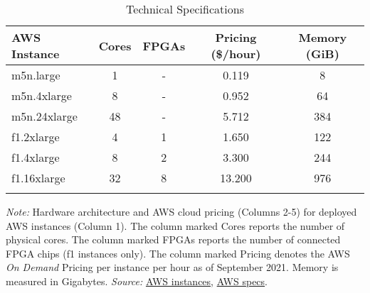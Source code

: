 \documentclass[12pt,american]{article}
\makeatletter
\newcommand{\cpuI}{m5n.large\@\xspace}
\newcommand{\cpuII}{m5n.4xlarge\@\xspace}
\newcommand{\cpuIII}{m5n.24xlarge\@\xspace}
\newcommand{\awsinstfI}{f1.2xlarge\@\xspace}
\newcommand{\awsinstfII}{f1.4xlarge\@\xspace}
\newcommand{\awsinstfIII}{f1.16xlarge\@\xspace}
\makeatother
\begin{document}
\begin{table}[ht!]
\begin{center}
\caption{Technical Specifications}
\begin{tabular}{l c c c c}
\toprule
\textbf{AWS Instance} & \textbf{Cores} & \textbf{FPGAs} & \textbf{Pricing} (\$/hour) & \textbf{Memory} (GiB) \\ 
\midrule
\cpuI & 1 & - & 0.119 & 8\\
\cpuII & 8 & - & 0.952 & 64\\
\cpuIII & 48 & - & 5.712 & 384\\
\awsinstfI & 4 & 1 & 1.650 & 122\\
\awsinstfII & 8 & 2 & 3.300 & 244\\
\awsinstfIII & 32 & 8 & 13.200 & 976\\
\bottomrule
\label{tab:tecspe}
\end{tabular}
\end{center}
\small
\noindent \textit{Note:} Hardware architecture and AWS cloud pricing (Columns 2-5) for deployed AWS instances (Column 1). The column marked Cores reports the number of physical cores. The column marked FPGAs reports the number of connected FPGA chips (f1 instances only). The column marked Pricing denotes the AWS \textit{On Demand} Pricing per instance per hour as of September 2021. Memory is measured in Gigabytes. \textit{Source:} \href{https://aws.amazon.com/ec2/instance-types/}{AWS instances}, \href{https://docs.aws.amazon.com/AWSEC2/latest/UserGuide/cpu-options-supported-instances-values.html}{AWS specs}.
\end{table}
\end{document}

